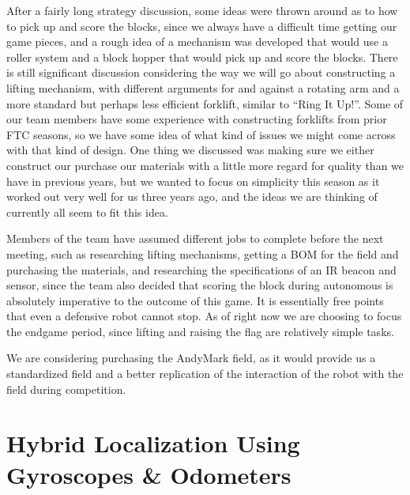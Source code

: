 \documentclass{article}
\begin{document}
After a fairly long strategy discussion, some ideas were thrown around as to how to pick up and score the blocks, since we always have a difficult time getting our game pieces, and a rough idea of a mechanism was developed that would use a roller system and a block hopper that would pick up and score the blocks. There is still significant discussion considering the way we will go about constructing a lifting mechanism, with different arguments for and against a rotating arm and a more standard but perhaps less efficient forklift, similar to ``Ring It Up!''. Some of our team members have some experience with constructing forklifts from prior FTC seasons, so we have some idea of what kind of issues we might come across with that kind of design. One thing we discussed was making sure we either construct our purchase our materials with a little more regard for quality than we have in previous years, but we wanted to focus on simplicity this season as it worked out very well for us three years ago, and the ideas we are thinking of currently all seem to fit this idea.

Members of the team have assumed different jobs to complete before the next meeting, such as researching lifting mechanisms, getting a BOM for the field and purchasing the materials, and researching the specifications of an IR beacon and sensor, since the team also decided that scoring the block during autonomous is absolutely imperative to the outcome of this game. It is essentially free points that even a defensive robot cannot stop. As of right now we are choosing to focus the endgame period, since lifting and raising the flag are relatively simple tasks. 

We are considering purchasing the AndyMark field, as it would provide us a standardized field and a better replication of the interaction of the robot with the field during competition. 
\newpage
\section{Hybrid Localization Using Gyroscopes \& Odometers}
\end{document}

